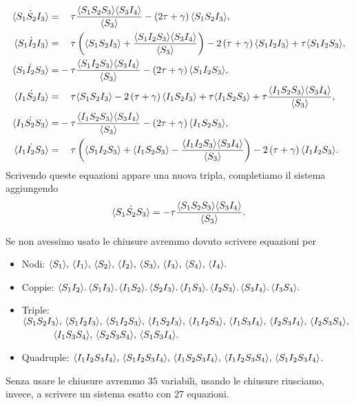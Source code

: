  \begin{equation*}
 \begin{aligned}
\dot{\angol{S_1S_2I_3}}=&\spa \tau \frac{\angol{S_1S_2S_3}\angol{S_3I_4}}{\angol{S_3}} -\tonde{ 2\tau + \gamma} \angol{S_1S_2I_3},\\
\dot{\angol{S_1I_2I_3}} =&\spa \tau \tonde{ \angol{S_1S_2I_3}+\frac{\angol{S_1I_2S_3}\angol{S_3I_4}}{\angol{S_3} }} -2\tonde{ \tau + \gamma} \angol{S_1I_2I_3} + \tau \angol{S_1 I_2 S_3},\\
\dot{\angol{S_1I_2S_3}} =&-\tau \frac{\angol{S_1I_2S_3}\angol{S_3I_4}}{\angol{S_3}} -\tonde{ 2\tau + \gamma} \angol{S_1I_2S_3},\\
\dot{\angol{I_1S_2I_3}} =&\spa \tau  \angol{S_1S_2I_3} -2\tonde{ \tau + \gamma} \angol{I_1S_2I_3} + \tau \angol{I_1S_2S_3}+\tau \frac{\angol{I_1S_2S_3}\angol{S_3I_4}}{\angol{S_3}},\\
\dot{\angol{I_1S_2S_3}}=&-\tau \frac{\angol{ I_1S_2S_3}\angol{S_3I_4}}{\angol{S_3}}-\tonde{ 2 \tau + \gamma} \angol{I_1S_2S_3},\\
\dot{\angol{I_1I_2S_3}} =&\spa\tau \tonde{  \angol{S_1I_2S_3}+ \angol{I_1S_2S_3} - \frac{\angol{I_1I_2S_3}\angol{S_3I_4}}{\angol{S_3}}} -2\tonde{ \tau + \gamma} \angol{I_1I_2S_3}.
 	\end{aligned}
 	\end{equation*}
 Scrivendo queste equazioni appare una nuova tripla, completiamo il sistema aggiungendo 
$$\dot{\langle S_1 S_2 S_3 \rangle} = -\tau\frac{\langle S_1S_2S_3 \rangle\langle S_3I_4 \rangle}{\langle S_3 \rangle}.$$
 
 Se non avessimo usato le chiusure avremmo dovuto scrivere equazioni per 
\begin{itemize}
	\item Nodi: $\langle S_1 \rangle,\, \langle I_1 \rangle, \, \langle S_2 \rangle,\, \langle I_2 \rangle, \,\langle S_3 \rangle,\, \langle I_3 \rangle, \,\langle S_4 \rangle,\, \langle I_4 \rangle.$
	\item Coppie: 
$  \langle S_1I_2 \rangle. \,
	\langle S_1I_3 \rangle. \,
	\langle I_1S_2 \rangle. \,
	\langle S_2I_3 \rangle. \,
	\langle I_1S_3 \rangle. \,
	\langle I_2S_3 \rangle. \,
	\langle S_3I_4 \rangle. \,
	\langle I_3S_4 \rangle.$
	\item Triple: $ \langle S_1S_2I_3 \rangle, \,\langle  S_1I_2I_3 \rangle, \, \langle S_1I_2S_3 \rangle, \, \langle I_1S_2I_3 \rangle, \, \langle I_1I_2S_3 \rangle, \, \langle I_1S_3I_4 \rangle, \, \langle I_2S_3I_4 \rangle, \, \langle I_2S_3S_4 \rangle,$\\
	\textcolor{white}{Triple:} $\langle I_1S_3S_4 \rangle, \, \langle S_2S_3S_4 \rangle, \, \langle S_1S_3I_4 \rangle.$
	 \item Quadruple: $\langle I_1I_2S_3I_4 \rangle,\,
\langle S_1I_2S_3I_4 \rangle,\,
\langle I_1S_2S_3I_4 \rangle,\,
\langle I_1I_2S_3S_4 \rangle,\,
\langle S_1I_2S_3I_4 \rangle$.
\end{itemize}
Senza usare le chiusure avremmo  $35$ variabili, usando le chiusure riusciamo, invece, a scrivere un sistema esatto con $27$ equazioni.



 